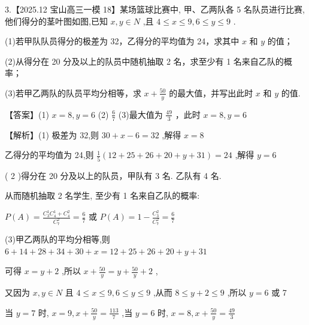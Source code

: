 \documentclass[10pt]{article}
\begin{document}
3.【2025.12 宝山高三一模 18】某场篮球比赛中, 甲、乙两队各 5 名队员进行比赛, 他们得分的茎叶图如图,已知 \(x,y \in  N\) ,且 \(4 \leq  x \leq  9,6 \leq  y \leq  9\) .

(1)若甲队队员得分的极差为 32，乙得分的平均值为 24，求其中 \(x\) 和 \(y\) 的值；

(2)从得分在 20 分及以上的队员中随机抽取 2 名，求至少有 1 名来自乙队的概率；

(3)若甲乙两队的队员平均分相等，求 \(x + \frac{50}{y}\) 的最大值，并写出此时 \(x\) 和 \(y\) 的值.

\begin{center}
\end{center}

【答案】(1) \(x = 8,y = 6\) (2) \(\frac{6}{7}\) (3)最大值为 \(\frac{49}{3}\) ，此时 \(x = 8,y = 6\)

【解析】(1) 极差为 32,则 \({30} + x - 6 = {32}\) ,解得 \(x = 8\)

乙得分的平均值为 24,则 \(\frac{1}{5}\left( {{12} + {25} + {26} + {20} + y + {31}}\right)  = {24}\) ,解得 \(y = 6\)

( 2 )得分在 20 分及以上的队员，甲队有 3 名. 乙队有 4 名.

从而随机抽取 2 名学生, 至少有 1 名来自乙队的概率:

\(P\left( A\right)  = \frac{{C}_{3}^{1}{C}_{4}^{1} + {C}_{4}^{2}}{{C}_{7}^{2}} = \frac{6}{7}\) 或 \(P\left( A\right)  = 1 - \frac{{C}_{3}^{2}}{{C}_{7}^{2}} = \frac{6}{7}\)

(3)甲乙两队的平均分相等,则 \(6 + {14} + {28} + {34} + {30} + x = {12} + {25} + {26} + {20} + y + {31}\)

可得 \(x = y + 2\) ,所以 \(x + \frac{50}{y} = y + \frac{50}{y} + 2\) ,

又因为 \(x,y \in  N\) 且 \(4 \leq  x \leq  9,6 \leq  y \leq  9\) ,从而 \(8 \leq  y + 2 \leq  9\) ,所以 \(y = 6\) 或 7

当 \(y = 7\) 时, \(x = 9,x + \frac{50}{y} = \frac{113}{7}\) ,当 \(y = 6\) 时, \(x = 8,x + \frac{50}{y} = \frac{49}{3}\)
\end{document}
